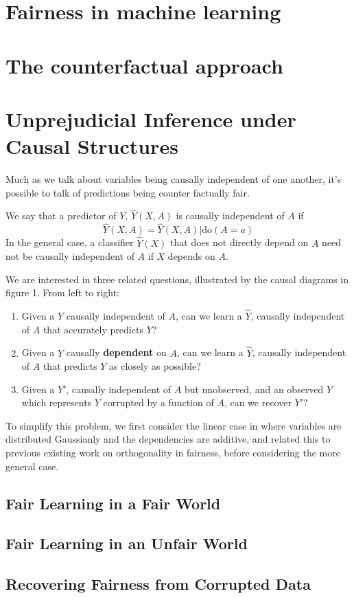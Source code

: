 \documentclass{article}
\begin{document}
\section{Fairness in machine learning}


\section{The counterfactual approach}



\section{Unprejudicial Inference under Causal Structures}
\label{sec-1}

Much as we talk about variables being causally independent of one
another, it's possible to talk of predictions being counter factually
fair.

We say that a predictor of $Y$, $\hat Y(X,A)$ is causally
independent of $A$ if 
%
\[ \hat Y(X,A)=\hat Y(X,A)|\text{do}(A=a) \] 
%
In the general case, a classifier $\hat Y (X)$ that does not directly
depend on $A$ need not be causally independent of $A$ if $X$ depends on $A$.

We are interested in three related questions, illustrated by the
causal diagrams in figure 1. From left to right:

\begin{enumerate}
\item Given a $Y$ causally independent of $A$, can we learn a $\hat Y$,
causally independent of $A$ that accurately predicts $Y$?
\item Given a $Y$ causally \textbf{dependent} on $A$, can we learn a $\hat Y$,
causally independent of $A$ that predicts $Y$ as closely as possible?
\item Given a $Y'$, causally independent of $A$ but unobserved, and an
observed $Y$ which represents $Y$ corrupted by a function of $A$,
can we recover $Y'$?
\end{enumerate}

To simplify this problem, we first consider the linear case in where
variables are distributed Gaussianly and the dependencies are
additive, and related this to previous existing work on orthogonality
in fairness, before considering the more general case.

\subsection{Fair Learning in a Fair World}
\label{sec-1-1}
\subsection{Fair Learning in an Unfair World}
\label{sec-1-2}
\subsection{Recovering Fairness from Corrupted Data}
\label{sec-1-3}




\end{document}

